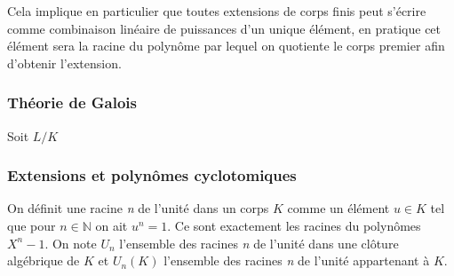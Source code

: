 \documentclass[a4paper]{article} %
\numberwithin{equation}{section}
\newcommand\nroot[1]{\textit{#1}\up{\textit{ième}}}
\begin{document}
Cela implique en particulier que toutes extensions de corps finis peut s'écrire
comme combinaison linéaire de puissances d'un unique élément, en pratique cet
élément sera la racine du polynôme par lequel on quotiente le corps premier afin
d'obtenir l'extension.

\subsubsection{Théorie de Galois}

Soit $L/K$ 
\subsubsection{Extensions et polynômes cyclotomiques}
On définit une racine \nroot{n} de l'unité dans un corps $K$ 
comme un élément $u\in K$ tel que pour $n\in\mathbb{N}$ on ait $u^n = 1$. Ce 
sont exactement les racines du polynômes $X^n - 1$.
On note $U_n$ l'ensemble des racines \nroot{n} de l'unité dans une clôture 
algébrique de $K$ et $U_n(K)$ l'ensemble des racines \nroot{n} de l'unité 
appartenant à $K$.
\end{document}
